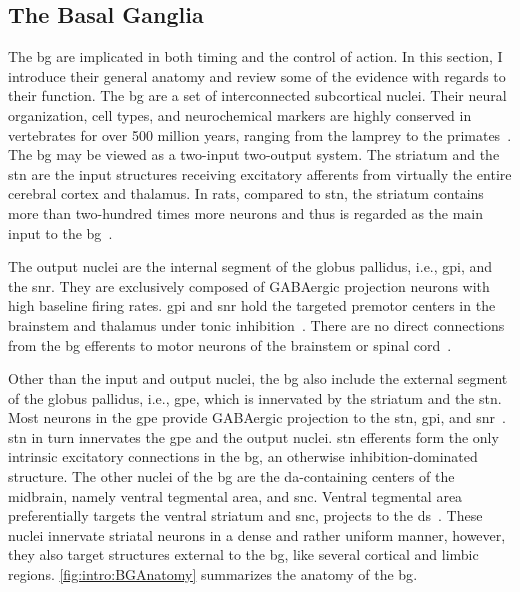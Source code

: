 \subsection{The Basal Ganglia}
\label{intro:BGAnatomy}
The \gls{bg} are implicated in both timing and the control of action.
In this section, I introduce their general anatomy and review some of the evidence with regards to their function.
The \gls{bg} are a set of interconnected subcortical nuclei.
Their neural organization, cell types, and neurochemical markers are highly conserved in vertebrates for over 500 million years, ranging from the lamprey to the primates~\cite{Grillner2016BG}.
The \gls{bg} may be viewed as a two-input two-output system.
The striatum and the \gls{stn} are the input structures receiving excitatory afferents from virtually the entire cerebral cortex and thalamus.
In rats, compared to \gls{stn}, the striatum contains more than two-hundred times more neurons and thus is regarded as the main input to the \gls{bg}~\cite{Oorschot1996}.
\par
The output nuclei are the internal segment of the globus pallidus, i.e., \gls{gpi}, and the \gls{snr}.
They are exclusively composed of GABAergic projection neurons with high baseline firing rates.
\Gls{gpi} and \gls{snr} hold the targeted premotor centers in the brainstem and thalamus under tonic inhibition~\cite{Redgrave2010}.
There are no direct connections from the \gls{bg} efferents to motor neurons of the brainstem or spinal cord~\cite{Mink1996}.
\par
Other than the input and output nuclei, the \gls{bg} also include the external segment of the globus pallidus, i.e., \gls{gpe}, which is innervated by the striatum and the \gls{stn}.
Most neurons in the \gls{gpe} provide GABAergic projection to the \gls{stn}, \gls{gpi}, and \gls{snr}~\cite{Dudman2015Book}.
\Gls{stn} in turn innervates the \gls{gpe} and the output nuclei.
\Gls{stn} efferents form the only intrinsic excitatory connections in the \gls{bg}, an otherwise inhibition-dominated structure.
The other nuclei of the \gls{bg} are the \gls{da}-containing centers of the midbrain, namely ventral tegmental area, and \gls{snc}.
Ventral tegmental area preferentially targets the ventral striatum and \gls{snc}, projects to the \gls{ds}~\cite{Cox2019NatRevNeurosci}.
These nuclei innervate striatal neurons in a dense and rather uniform manner, however, they also target structures external to the \gls{bg}, like several cortical and limbic regions.
\autoref{fig:intro:BGAnatomy} summarizes the anatomy of the \gls{bg}.

